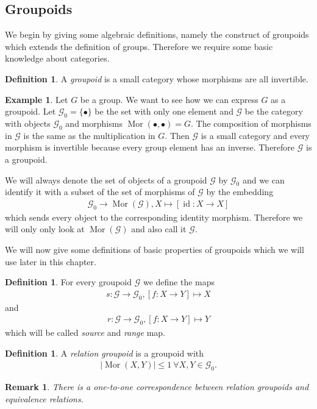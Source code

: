 \documentclass[12pt,a4paper]{scrartcl}
\theoremstyle{plain}
\newtheorem{Remark}[Theorem]{Remark}
\theoremstyle{definition}
\newtheorem{Definition}[Theorem]{Definition}
\newtheorem{Example}[Theorem]{Example}
\newcommand{\2}{\mathbb{Z} / 2 \mathbb{Z}}
\newcommand{\G}{\mathcal{G}}
\newcommand{\1}{\bar{1}}
\newcommand{\0}{\bar{0}}
\newcommand{\id}{\operatorname{id}}
\newcommand{\Mor}{\operatorname{Mor}}
\begin{document}
\subsection{Groupoids}
We begin by giving some algebraic definitions, namely the construct of groupoids which extends the definition of groups. Therefore we require some basic knowledge about categories. 
\begin{Definition}
	A \emph{groupoid} is a small category whose morphisms are all invertible.
\end{Definition}
\begin{Example} \label{group}
	Let $G$ be a group. We want to see how we can express $G$ as a groupoid. Let $\mathcal{G}_0 = \{\bullet\}$ be the set with only one element  and $\mathcal{G}$ be the category with objects $\G_0$ and morphisms $\Mor(\bullet, \bullet) = G$. The composition of morphisms in $\mathcal{G}$ is the same as the multiplication in $G$. Then $\mathcal{G}$ is a small category and every morphism is invertible because every group element has an inverse. Therefore $\mathcal{G}$ is a groupoid.
\end{Example}
We will always denote the set of objects of a groupoid $\mathcal{G}$ by $\mathcal{G}_0$ and we can identify it with a subset of the set of morphisms of $\mathcal{G}$ by the embedding 
\begin{align*}
	\mathcal{G}_0 \to \Mor(\mathcal{G}), X \mapsto [\id\colon X \to X]
\end{align*}
which sends every object to the corresponding identity morphism. Therefore we will only only look at $\Mor(\mathcal{G})$ and also call it $\mathcal{G}$. 

We will now give some definitions of basic properties of groupoids which we will use later in this chapter.

\begin{Definition}
	For every groupoid $\mathcal{G}$ we define the maps
	\begin{align*}
		s\colon \mathcal{G} \to \mathcal{G}_0, [f\colon X \to Y] \mapsto X
	\end{align*}
	and
	\begin{align*}
		r\colon\mathcal{G} \to \mathcal{G}_0, [f\colon X \to Y] \mapsto Y
	\end{align*}
	which will be called \emph{source} and \emph{range} map.
\end{Definition}
\begin{Definition}
	A \emph{relation groupoid} is a groupoid with 
	\begin{align*}
		|\Mor(X, Y)| \leq 1 \ \forall X,Y \in \G_0.
	\end{align*}
\end{Definition}
\begin{Remark}
	There is a one-to-one correspondence between relation groupoids and equivalence relations.
\end{Remark}
\end{document}
